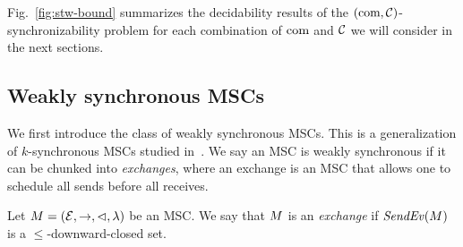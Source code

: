 Fig.~\ref{fig:stw-bound} summarizes the decidability results of the
$(\textup{com},\mathcal{C})$-synchronizability problem for each combination of $\textup{com}$ and $\mathcal{C}$ 
we will consider in the next sections.







\subsection{Weakly synchronous MSCs}

We first introduce the class of weakly synchronous MSCs. 
This is a generalization of $k$-synchronous MSCs studied 
in~\cite{DBLP:conf/cav/BouajjaniEJQ18}. 
We say an MSC is weakly synchronous if it can be chunked into \emph{exchanges}, where an exchange is an MSC that allows one to schedule all 
sends before all receives. 

\begin{definition}[exchange]\label{def:weak-synchr}
Let $M = (\mathcal{E},\to,\lhd,\lambda)$ be an MSC.
We say that $M$ is an \emph{exchange} if
$\mathit{SendEv}(M)$ is
a ${\le}$-downward-closed set.
\end{definition}

